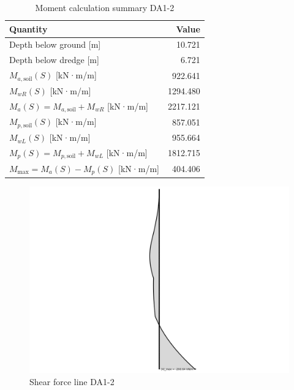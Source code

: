 \begin{table}[H]
  \centering
  \caption{Moment calculation summary DA1-2}
  \label{tab:moment_summary_DA1_2}
  \small
  \setlength{\tabcolsep}{8pt}
  \renewcommand{\arraystretch}{1.15}
  \begin{tabular}{@{}l r@{}}
    \toprule
    Quantity & Value \\
    \midrule
    Depth below ground [m] & 10.721 \\
    Depth below dredge [m] & 6.721 \\
    $M_{a,\text{soil}}(S)$ [kN·m/m] & 922.641 \\
    $M_{wR}(S)$ [kN·m/m] & 1294.480 \\
    $M_{a}(S) = M_{a,\text{soil}} + M_{wR}$ [kN·m/m] & 2217.121 \\
    $M_{p,\text{soil}}(S)$ [kN·m/m] & 857.051 \\
    $M_{wL}(S)$ [kN·m/m] & 955.664 \\
    $M_{p}(S) = M_{p,\text{soil}} + M_{wL}$ [kN·m/m] & 1812.715 \\
    $M_{\text{max}} = M_{a}(S) - M_{p}(S)$ [kN·m/m] & 404.406 \\
    \bottomrule
  \end{tabular}
\end{table}

\begin{figure}[H]
    \centering
    \includegraphics[width=0.80\linewidth]{figures/appendix-i/shear_max_10172.png}
    \caption{Shear force line DA1-2}
    \label{fig:appendix_shear_forces_DA1_2}
\end{figure}

